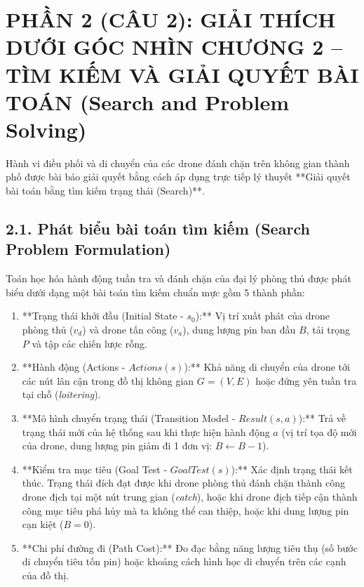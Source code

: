 \documentclass[../main.tex]{subfiles}
\begin{document}

\section{PHẦN 2 (CÂU 2): GIẢI THÍCH DƯỚI GÓC NHÌN CHƯƠNG 2 -- TÌM KIẾM VÀ GIẢI QUYẾT BÀI TOÁN (Search and Problem Solving)}

Hành vi điều phối và di chuyển của các drone đánh chặn trên không gian thành phố được bài báo \cite{mutzari2025defending} giải quyết bằng cách áp dụng trực tiếp lý thuyết **Giải quyết bài toán bằng tìm kiếm trạng thái (Search)**.

\subsection{2.1. Phát biểu bài toán tìm kiếm (Search Problem Formulation)}
Toán học hóa hành động tuần tra và đánh chặn của đại lý phòng thủ được phát biểu dưới dạng một bài toán tìm kiếm chuẩn mực gồm 5 thành phần:
\begin{enumerate}
    \item **Trạng thái khởi đầu (Initial State - $s_0$):** Vị trí xuất phát của drone phòng thủ ($v_d$) và drone tấn công ($v_a$), dung lượng pin ban đầu $B$, tải trọng $P$ và tập các chiến lược rỗng.
    \item **Hành động (Actions - $Actions(s)$):** Khả năng di chuyển của drone tới các nút lân cận trong đồ thị không gian $G=(V,E)$ hoặc đứng yên tuần tra tại chỗ (\textit{loitering}).
    \item **Mô hình chuyển trạng thái (Transition Model - $Result(s, a)$):** Trả về trạng thái mới của hệ thống sau khi thực hiện hành động $a$ (vị trí tọa độ mới của drone, dung lượng pin giảm đi 1 đơn vị: $B \leftarrow B - 1$).
    \item **Kiểm tra mục tiêu (Goal Test - $GoalTest(s)$):** Xác định trạng thái kết thúc. Trạng thái đích đạt được khi drone phòng thủ đánh chặn thành công drone địch tại một nút trung gian (\textit{catch}), hoặc khi drone địch tiếp cận thành công mục tiêu phá hủy mà ta không thể can thiệp, hoặc khi dung lượng pin cạn kiệt ($B = 0$).
    \item **Chi phí đường đi (Path Cost):** Đo đạc bằng năng lượng tiêu thụ (số bước di chuyển tiêu tốn pin) hoặc khoảng cách hình học di chuyển trên các cạnh của đồ thị.
\end{enumerate}
\end{document}
